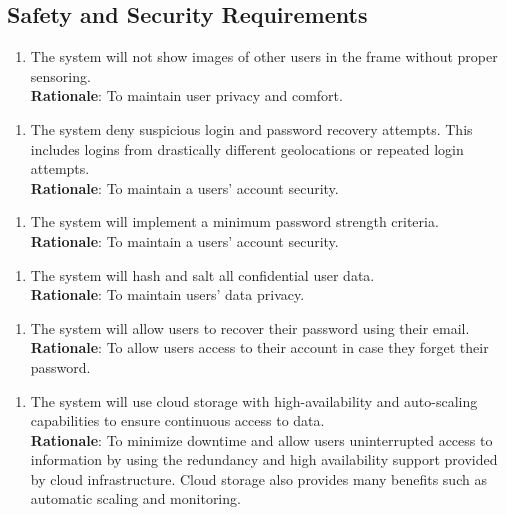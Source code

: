\documentclass{article}
\begin{document}
\subsection{Safety and Security Requirements}
\begin{enumerate}[{SR}1. ]
    \item The system will not show images of other users in the frame without proper sensoring.\\
    \textbf{Rationale}: To maintain user privacy and comfort. 
\end{enumerate} 
\begin{enumerate}[{SR}Mag2. ]
    \item The system deny suspicious login and password recovery attempts. This includes logins from drastically different geolocations or repeated login attempts.\\
    \textbf{Rationale}: To maintain a users' account security. 
\end{enumerate} 
\begin{enumerate}[{SR}Mag3. ]
    \item The system will implement a minimum password strength criteria.\\
    \textbf{Rationale}: To maintain a users' account security. 
\end{enumerate} 
\begin{enumerate}[{SR}Mag4. ]
    \item The system will hash and salt all confidential user data.\\
    \textbf{Rationale}: To maintain users' data privacy. 
\end{enumerate} 
\begin{enumerate}[{SR}Mag5. ]
    \item The system will allow users to recover their password using their email.\\
    \textbf{Rationale}: To allow users access to their account in case they forget their password. 
\end{enumerate} 
\begin{enumerate}[{SR}Zay1. ]
    \item The system will use cloud storage with high-availability and auto-scaling capabilities to ensure continuous access to data.\\
    \textbf{Rationale}: To minimize downtime and allow users uninterrupted access to information by using the redundancy and high availability support provided by cloud infrastructure. Cloud storage also provides many benefits such as automatic scaling and monitoring. 
\end{enumerate} 
\end{document}
